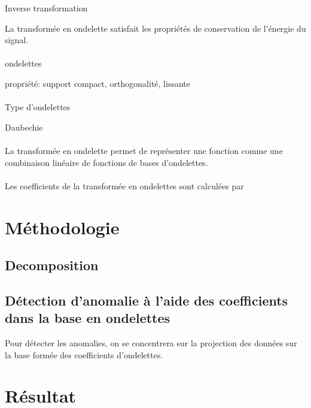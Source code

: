 Inverse transformation

La transformée en ondelette satisfait les propriétés de conservation de l'énergie du signal.



\paragraph{}
ondelettes

propriété:
support compact, orthogonalité, lissante
\paragraph{}
Type d'ondelettes

Daubechie

\paragraph{}
La transformée en ondelette permet de représenter une fonction comme une combinaison linéaire de
fonctions de bases d'ondelettes.

\paragraph{}
Les coefficients de la transformée en ondelettes sont calculées par

\section{Méthodologie}
\subsection{Decomposition}

\subsection{Détection d'anomalie à l'aide des coefficients dans la base en ondelettes}
Pour détecter les anomalies, on se concentrera sur la projection des données sur la base formée des coefficients d'ondelettes.
\section{Résultat}


